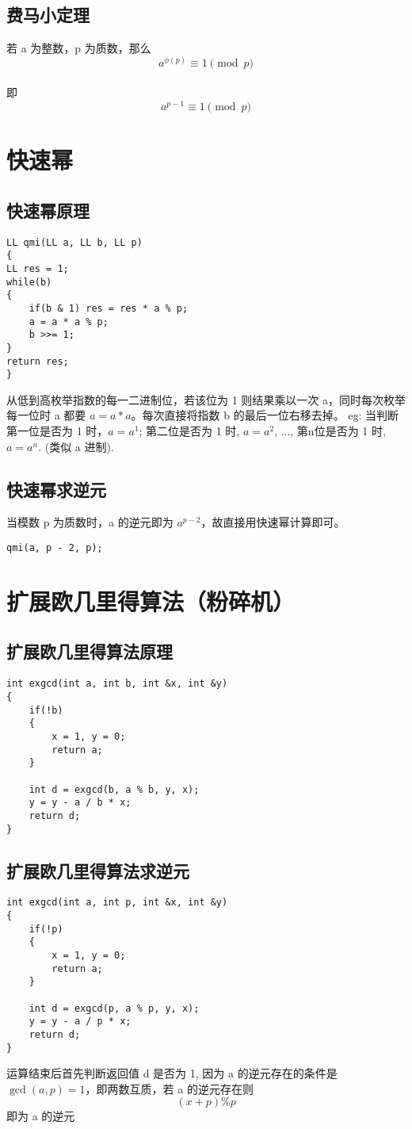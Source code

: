 \documentclass[]{book}
\begin{document}
\section{费马小定理}
若 a 为整数，p 为质数，那么
\[a^{\phi(p)}\equiv 1 \pmod{p}\]\\即
\[a^{p-1}\equiv 1 \pmod{p}\]
\chapter{快速幂}
\section{快速幂原理}
\begin{lstlisting}
LL qmi(LL a, LL b, LL p)
{
LL res = 1;
while(b)
{
    if(b & 1) res = res * a % p;
    a = a * a % p;
    b >>= 1;
}
return res;
}
\end{lstlisting}

从低到高枚举指数的每一二进制位，若该位为 1 则结果乘以一次 a，同时每次枚举每一位时 a 都要 $a = a * a$。每次直接将指数 b 的最后一位右移去掉。
eg: 当判断第一位是否为 1 时，$a = a^{1}$; 第二位是否为 1 时, $a = a^{2}$, ..., 第n位是否为 1 时, $a = a^{n}$. (类似 a 进制).
\section{快速幂求逆元}
当模数 p 为质数时，a 的逆元即为 $a^{p-2}$，故直接用快速幂计算即可。
\begin{lstlisting}
qmi(a, p - 2, p);
\end{lstlisting}
\chapter{扩展欧几里得算法（粉碎机）}
\section{扩展欧几里得算法原理}
\begin{lstlisting}
int exgcd(int a, int b, int &x, int &y)
{
    if(!b)
    {
        x = 1, y = 0;
        return a;
    }
    
    int d = exgcd(b, a % b, y, x);
    y = y - a / b * x;
    return d;
}
\end{lstlisting}
\section{扩展欧几里得算法求逆元}
\begin{lstlisting}
int exgcd(int a, int p, int &x, int &y)
{
    if(!p)
    {
        x = 1, y = 0;
        return a;
    }
    
    int d = exgcd(p, a % p, y, x);
    y = y - a / p * x;
    return d;
}
\end{lstlisting}
运算结束后首先判断返回值 d 是否为 1, 因为 a 的逆元存在的条件是 $\gcd(a, p) = 1$，即两数互质，若 a 的逆元存在则
\[(x + p) \% p\]
即为 a 的逆元
\end{document}

